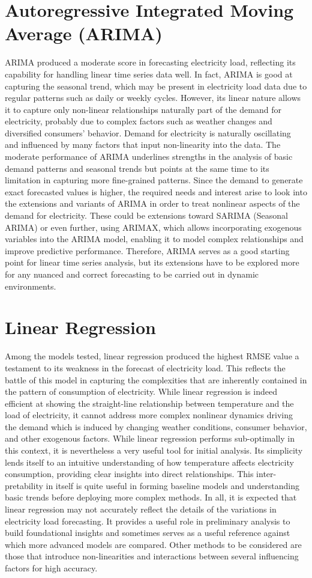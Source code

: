\documentclass[12pt, a4paper,twoside]{report}
\theoremstyle{plain} %
\theoremstyle{definition} %
\theoremstyle{remark} %
\numberwithin{equation}{chapter}
\begin{document}
\section{Autoregressive Integrated Moving Average (ARIMA)}
    ARIMA produced a moderate score in forecasting electricity load, reflecting its capability for handling linear time series data well. In fact, ARIMA is good at capturing the seasonal trend, which may be present in electricity load data due to regular patterns such as daily or weekly cycles. However, its linear nature allows it to capture only non-linear relationships naturally part of the demand for electricity, probably due to complex factors such as weather changes and diversified consumers' behavior.
Demand for electricity is naturally oscillating and influenced by many factors that input non-linearity into the data. The moderate performance of ARIMA underlines strengths in the analysis of basic demand patterns and seasonal trends but points at the same time to its limitation in capturing more fine-grained patterns. Since the demand to generate exact forecasted values is higher, the required needs and interest arise to look into the extensions and variants of ARIMA in order to treat nonlinear aspects of the demand for electricity. These could be extensions toward SARIMA (Seasonal ARIMA) or even further, using ARIMAX, which allows incorporating exogenous variables into the ARIMA model, enabling it to model complex relationships and improve predictive performance. Therefore, ARIMA serves as a good starting point for linear time series analysis, but its extensions have to be explored more for any nuanced and correct forecasting to be carried out in dynamic environments.
\section{Linear Regression}
    Among the models tested, linear regression produced the highest RMSE value a testament to its weakness in the forecast of electricity load. This reflects the battle of this model in capturing the complexities that are inherently contained in the pattern of consumption of electricity. While linear regression is indeed efficient at showing the straight-line relationship between temperature and the load of electricity, it cannot address more complex nonlinear dynamics driving the demand which is induced by changing weather conditions, consumer behavior, and other exogenous factors.
While linear regression performs sub-optimally in this context, it is nevertheless a very useful tool for initial analysis. Its simplicity lends itself to an intuitive understanding of how temperature affects electricity consumption, providing clear insights into direct relationships. This inter-pretability in itself is quite useful in forming baseline models and understanding basic trends before deploying more complex methods.
In all, it is expected that linear regression may not accurately reflect the details of the variations in electricity load forecasting. It provides a useful role in preliminary analysis to build foundational insights and sometimes serves as a useful reference against which more advanced models are compared. Other methods to be considered are those that introduce non-linearities and interactions between several influencing factors for high accuracy.
\end{document}
